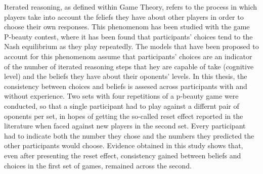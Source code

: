 \documentclass[
12pt, %
spanish, %
onehalfspacing, %
headsepline, %
]{MastersDoctoralThesis} %
\begin{document}
Iterated reasoning, as defined within Game Theory, refers to the process in which players take into account the feliefs they have about other players in order to choose their own responses. This phenomenom has been studied with the game P-beauty contest, where it has been found that participants' choices tend to the Nash equilibrium as they play repeatedly. The models that have been proposed to account for this phenomenom assume that participants' choices are an indicator of the number of iterated reasoning steps that hey are capable of take (cognitive level) and the beliefs they have about their oponents' levels. In this thesis, the consistency between choices and beliefs is assesed across participants with and without experience. Two sets with four repetitions of a p-beauty game were conducted, so that a single participant had to play against a differnt pair of oponents per set, in hopes of getting the so-called reset effect reported in the literature when faced against new players in the second set. Every participant had to indicate both the number they chose and the numbers they predicted the other participants would choose. Evidence obtained in this study shows that, even after presenting the reset effect, consistency gained between beliefs and choices in the first set of games, remained across the second.\\


\end{document}
